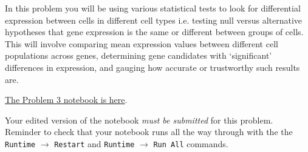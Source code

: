 \documentclass[11pt]{exam}
\begin{document}
\begin{questions}
\newpage
\question[40] In this problem you will be using various statistical tests to look for differential expression between cells in different cell types i.e. testing null versus alternative hypotheses that gene expression is the same or different between groups of cells. This will involve comparing mean expression values between different cell populations across genes, determining gene candidates with `significant' differences in expression, and gauging how accurate or trustworthy such results are.

 \href{https://github.com/pachterlab/BI-BE-CS-183-2023/blob/main/HW7/Problem3.ipynb}{The Problem 3 notebook is here}.

 Your edited version of the notebook \textit{must be submitted } for this problem. Reminder to check that your notebook runs all the way through with the the {\tt Runtime} $\xrightarrow{}$ {\tt Restart} and {\tt Runtime} $\xrightarrow{}$ {\tt Run All} commands.

  \end{questions}
\end{document}
